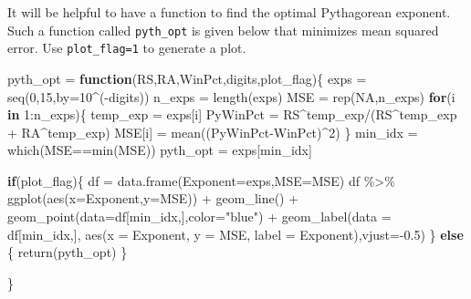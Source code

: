 \documentclass[
  11pt,
]{book}
\newenvironment{Shaded}{\begin{snugshade}}{\end{snugshade}}
\newcommand{\AttributeTok}[1]{\textcolor[rgb]{0.77,0.63,0.00}{#1}}
\newcommand{\ConstantTok}[1]{\textcolor[rgb]{0.00,0.00,0.00}{#1}}
\newcommand{\ControlFlowTok}[1]{\textcolor[rgb]{0.13,0.29,0.53}{\textbf{#1}}}
\newcommand{\DecValTok}[1]{\textcolor[rgb]{0.00,0.00,0.81}{#1}}
\newcommand{\FloatTok}[1]{\textcolor[rgb]{0.00,0.00,0.81}{#1}}
\newcommand{\FunctionTok}[1]{\textcolor[rgb]{0.00,0.00,0.00}{#1}}
\newcommand{\NormalTok}[1]{#1}
\newcommand{\OtherTok}[1]{\textcolor[rgb]{0.56,0.35,0.01}{#1}}
\newcommand{\SpecialCharTok}[1]{\textcolor[rgb]{0.00,0.00,0.00}{#1}}
\newcommand{\StringTok}[1]{\textcolor[rgb]{0.31,0.60,0.02}{#1}}
\theoremstyle{definition}
\theoremstyle{definition}
\theoremstyle{definition}
\theoremstyle{definition}
\theoremstyle{remark}
\begin{document}
It will be helpful to have a function to find the optimal Pythagorean exponent. Such a function called \texttt{pyth\_opt} is given below that minimizes mean squared error. Use \texttt{plot\_flag=1} to generate a plot.

\begin{Shaded}
\begin{Highlighting}[]
\NormalTok{pyth\_opt }\OtherTok{=} \ControlFlowTok{function}\NormalTok{(RS,RA,WinPct,digits,plot\_flag)\{}
\NormalTok{  exps }\OtherTok{=} \FunctionTok{seq}\NormalTok{(}\DecValTok{0}\NormalTok{,}\DecValTok{15}\NormalTok{,}\AttributeTok{by=}\DecValTok{10}\SpecialCharTok{\^{}}\NormalTok{(}\SpecialCharTok{{-}}\NormalTok{digits))}
\NormalTok{  n\_exps }\OtherTok{=} \FunctionTok{length}\NormalTok{(exps)}
\NormalTok{  MSE }\OtherTok{=} \FunctionTok{rep}\NormalTok{(}\ConstantTok{NA}\NormalTok{,n\_exps)}
  \ControlFlowTok{for}\NormalTok{(i }\ControlFlowTok{in} \DecValTok{1}\SpecialCharTok{:}\NormalTok{n\_exps)\{}
\NormalTok{    temp\_exp }\OtherTok{=}\NormalTok{ exps[i]}
\NormalTok{    PyWinPct }\OtherTok{=}\NormalTok{ RS}\SpecialCharTok{\^{}}\NormalTok{temp\_exp}\SpecialCharTok{/}\NormalTok{(RS}\SpecialCharTok{\^{}}\NormalTok{temp\_exp }\SpecialCharTok{+}\NormalTok{ RA}\SpecialCharTok{\^{}}\NormalTok{temp\_exp)}
\NormalTok{    MSE[i] }\OtherTok{=} \FunctionTok{mean}\NormalTok{((PyWinPct}\SpecialCharTok{{-}}\NormalTok{WinPct)}\SpecialCharTok{\^{}}\DecValTok{2}\NormalTok{)}
\NormalTok{  \}}
\NormalTok{  min\_idx }\OtherTok{=} \FunctionTok{which}\NormalTok{(MSE}\SpecialCharTok{==}\FunctionTok{min}\NormalTok{(MSE))}
\NormalTok{  pyth\_opt }\OtherTok{=}\NormalTok{ exps[min\_idx]}
  
  \ControlFlowTok{if}\NormalTok{(plot\_flag)\{}
\NormalTok{    df }\OtherTok{=} \FunctionTok{data.frame}\NormalTok{(}\AttributeTok{Exponent=}\NormalTok{exps,}\AttributeTok{MSE=}\NormalTok{MSE)}
\NormalTok{    df }\SpecialCharTok{\%\textgreater{}\%} \FunctionTok{ggplot}\NormalTok{(}\FunctionTok{aes}\NormalTok{(}\AttributeTok{x=}\NormalTok{Exponent,}\AttributeTok{y=}\NormalTok{MSE)) }\SpecialCharTok{+} 
      \FunctionTok{geom\_line}\NormalTok{() }\SpecialCharTok{+} 
      \FunctionTok{geom\_point}\NormalTok{(}\AttributeTok{data=}\NormalTok{df[min\_idx,],}\AttributeTok{color=}\StringTok{"blue"}\NormalTok{)  }\SpecialCharTok{+}
      \FunctionTok{geom\_label}\NormalTok{(}\AttributeTok{data =}\NormalTok{ df[min\_idx,],}
                 \FunctionTok{aes}\NormalTok{(}\AttributeTok{x =}\NormalTok{ Exponent, }\AttributeTok{y =}\NormalTok{ MSE, }\AttributeTok{label =}\NormalTok{ Exponent),}\AttributeTok{vjust=}\SpecialCharTok{{-}}\FloatTok{0.5}\NormalTok{)}
\NormalTok{  \} }\ControlFlowTok{else}\NormalTok{ \{}
    \FunctionTok{return}\NormalTok{(pyth\_opt)}
\NormalTok{  \}}
  
\NormalTok{\}}
\end{Highlighting}
\end{Shaded}
\end{document}
